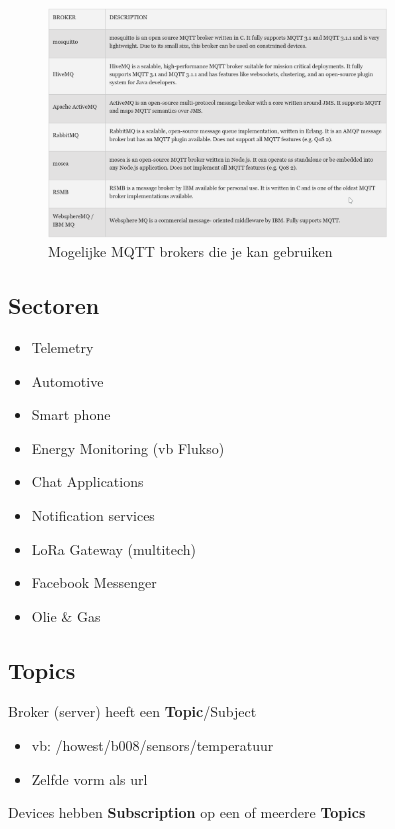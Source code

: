 \documentclass{article}
\newcommand{\bold}[1]{\textbf{#1}}
\begin{document}
\begin{figure}[H]
    \centering
    \includegraphics[width=0.8\textwidth]{mqtt-brokers.png}
    \caption{Mogelijke MQTT brokers die je kan gebruiken}
\end{figure}

\subsection{Sectoren}

\begin{itemize}
    \item Telemetry
    \item Automotive
    \item Smart phone
    \item Energy Monitoring (vb Flukso)
    \item Chat Applications
    \item Notification services
    \item LoRa Gateway (multitech)
    \item Facebook Messenger
    \item Olie \& Gas
\end{itemize}

\subsection{Topics}

Broker (server) heeft een \bold{Topic}/Subject
\begin{itemize}
    \item vb: /howest/b008/sensors/temperatuur
    \item Zelfde vorm als url
\end{itemize}

Devices hebben \bold{Subscription} op een of meerdere \bold{Topics}
\end{document}
